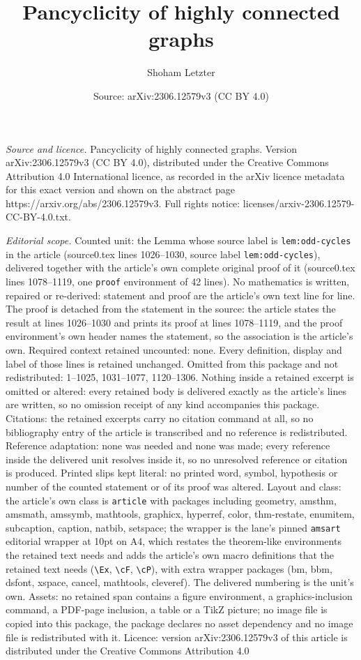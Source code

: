 \documentclass[10pt,a4paper]{amsart}
\title[Pancyclicity of highly connected graphs]{Pancyclicity of highly connected graphs}
\author{Shoham Letzter}
\date{Source: arXiv:2306.12579v3 (CC BY 4.0)}
\begin{document}
\maketitle

\noindent\emph{Source and licence.} Pancyclicity of highly connected graphs. Version arXiv:2306.12579v3 (CC BY 4.0), distributed under the Creative Commons Attribution 4.0 International licence, as recorded in the arXiv licence metadata for this exact version and shown on the abstract page https://arxiv.org/abs/2306.12579v3. Full rights notice: licenses/arxiv-2306.12579-CC-BY-4.0.txt.\par\smallskip

\noindent\textit{Editorial scope.} Counted unit: the Lemma whose source label is \texttt{lem:odd-cycles} in the article (source0.tex lines 1026--1030, source label \texttt{lem:odd-cycles}), delivered together with the article's own complete original proof of it (source0.tex lines 1078--1119, one \texttt{proof} environment of 42 lines). No mathematics is written, repaired or re-derived: statement and proof are the article's own text line for line. The proof is detached from the statement in the source: the article states the result at lines 1026--1030 and prints its proof at lines 1078--1119, and the proof environment's own header names the statement, so the association is the article's own. Required context retained uncounted: none. Every definition, display and label of those lines is retained unchanged. Omitted from this package and not redistributed: 1--1025, 1031--1077, 1120--1306. Nothing inside a retained excerpt is omitted or altered: every retained body is delivered exactly as the article's lines are written, so no omission receipt of any kind accompanies this package. Citations: the retained excerpts carry no citation command at all, so no bibliography entry of the article is transcribed and no reference is redistributed. Reference adaptation: none was needed and none was made; every reference inside the delivered unit resolves inside it, so no unresolved reference or citation is produced. Printed slips kept literal: no printed word, symbol, hypothesis or number of the counted statement or of its proof was altered. Layout and class: the article's own class is \texttt{article} with packages including geometry, amsthm, amsmath, amssymb, mathtools, graphicx, hyperref, color, thm-restate, enumitem, subcaption, caption, natbib, setspace; the wrapper is the lane's pinned \texttt{amsart} editorial wrapper at 10pt on A4, which restates the theorem-like environments the retained text needs and adds the article's own macro definitions that the retained text needs (\texttt{\textbackslash Ex}, \texttt{\textbackslash cF}, \texttt{\textbackslash cP}), with extra wrapper packages (bm, bbm, dsfont, xspace, cancel, mathtools, cleveref). The delivered numbering is the unit's own. Assets: no retained span contains a figure environment, a graphics-inclusion command, a PDF-page inclusion, a table or a TikZ picture; no image file is copied into this package, the package declares no asset dependency and no image file is redistributed with it. Licence: version arXiv:2306.12579v3 of this article is distributed under the Creative Commons Attribution 4.0 
\end{document}
